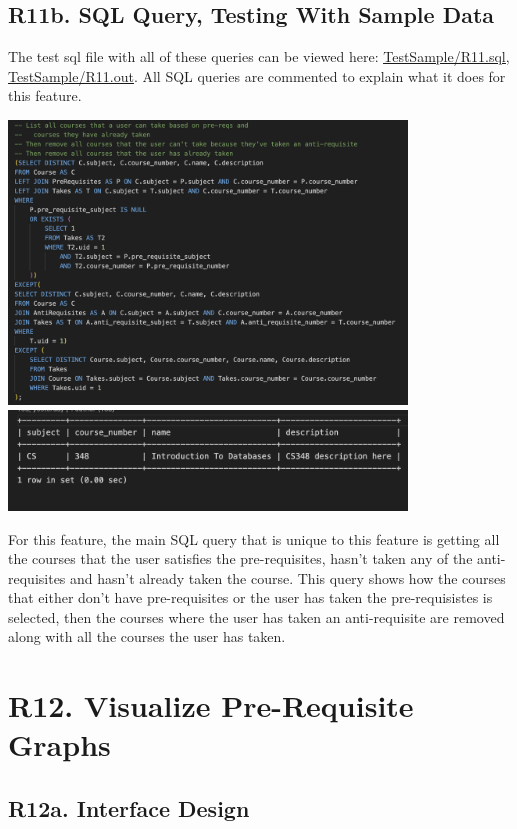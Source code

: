 \documentclass[12pt, a4paper]{article}
\begin{document}
\subsection*{R11b. SQL Query, Testing With Sample Data}
The test sql file with all of these queries can be viewed here: \underline{\href{https://github.com/Kggupta/DegreeMap/tree/main/Database/Queries/TestSample}{TestSample/R11.sql}}, \underline{\href{https://github.com/Kggupta/DegreeMap/tree/main/Database/Queries/TestSample}{TestSample/R11.out}}. All SQL queries are commented to explain what it does for this feature.
\begin{center}
    \includegraphics[width=400px]{R11/q1}
    \includegraphics[width=400px]{R11/q1out}
\end{center}
For this feature, the main SQL query that is unique to this feature is getting all the courses that the user satisfies the pre-requisites, hasn't taken any of the anti-requisites and hasn't already taken the course. This query shows how the courses that either don't have pre-requisites or the user has taken the pre-requisistes is selected, then the courses where the user has taken an anti-requisite are removed along with all the courses the user has taken.
\section*{R12. Visualize Pre-Requisite Graphs}
\label{sec:R12}
\subsection*{R12a. Interface Design}
\end{document}
